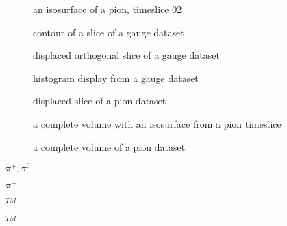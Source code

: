 {\samepage \clearpage \begin{figure}%
\setlength{\epsfysize}{4cm}
\centerline{}
\caption{an isosurface of a pion, timeslice 02}
\label{pion02.fig}

\setlength{\epsfysize}{4cm}
\centerline{}
\caption{contour of a slice of a gauge dataset}
\label{contour.fig}

\setlength{\epsfysize}{4cm}
\centerline{}
\caption{displaced orthogonal slice of a gauge dataset}
\label{displace.fig}

\setlength{\epsfysize}{4cm}
\centerline{}
\caption{histogram display from a gauge dataset}
\label{histogram.fig}

\end{figure}
}


\newpage

{\samepage \clearpage \begin{figure}%
\setlength{\epsfysize}{4cm}
\centerline{}
\caption{displaced slice of a pion dataset}
\label{slice.fig}

\setlength{\epsfysize}{4cm}
\centerline{}
\caption{a complete volume with an isosurface from a pion timeslice}
\label{splatter.fig}

\setlength{\epsfysize}{4cm}
\centerline{}
\caption{a complete volume of a pion dataset}
\label{volume1.fig}

\end{figure}
}


\newpage

{\samepage \clearpage $ \pi ^{+}, \pi ^{0} $
}


\newpage

{\samepage \clearpage $ \pi ^{-} $
}


\newpage

{\samepage \clearpage $^{TM}$
}


\newpage

{\samepage \clearpage $^{TM}$
}



